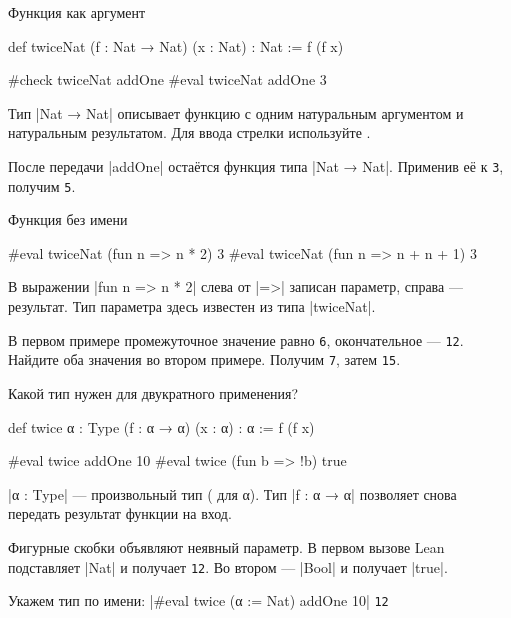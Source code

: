 \documentclass[aspectratio=169]{beamer}
\begin{document}
\begin{frame}[fragile]{Функция как аргумент}
\begin{lean}
def twiceNat (f : Nat → Nat) (x : Nat) : Nat :=
  f (f x)

#check twiceNat addOne
#eval twiceNat addOne 3
\end{lean}
Тип \leaninline|Nat → Nat| описывает функцию с одним натуральным аргументом и натуральным результатом. Для ввода стрелки используйте .

\pause
После передачи \leaninline|addOne| остаётся функция типа \leaninline|Nat → Nat|. \pause Применив её к \texttt{3}, получим \texttt{5}.
\end{frame}

\begin{frame}[fragile]{Функция без имени}
\begin{lean}
#eval twiceNat (fun n => n * 2) 3
#eval twiceNat (fun n => n + n + 1) 3
\end{lean}
В выражении \leaninline|fun n => n * 2| слева от \leaninline|=>| записан параметр, справа — результат. Тип параметра здесь известен из типа \leaninline|twiceNat|.

\pause
В первом примере промежуточное значение равно \texttt{6}, окончательное — \texttt{12}. Найдите оба значения во втором примере. \pause Получим \texttt{7}, затем \texttt{15}.
\end{frame}

\begin{frame}[fragile]{Какой тип нужен для двукратного применения?}
\begin{lean}
def twice {α : Type} (f : α → α) (x : α) : α :=
  f (f x)

#eval twice addOne 10
#eval twice (fun b => !b) true
\end{lean}
\leaninline|α : Type| — произвольный тип ( для α). Тип \leaninline|f : α → α| позволяет снова передать результат функции на вход.

Фигурные скобки объявляют неявный параметр. \pause
В первом вызове Lean подставляет \leaninline|Nat| и получает \texttt{12}.
\pause
Во втором — \leaninline|Bool| и получает \leaninline|true|.

\pause
Укажем тип по имени:\quad
\leaninline|#eval twice (α := Nat) addOne 10| \qquad \texttt{12}
\end{frame}
\end{document}
